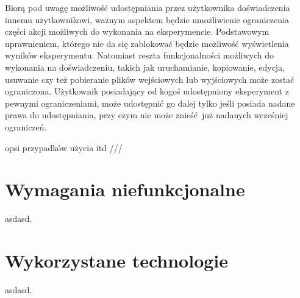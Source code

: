 Biorą pod uwagę możliwość udostępniania przez użytkownika doświadczenia innemu użytkownikowi, ważnym aspektem będzie umożliwienie ograniczenia części akcji możliwych do wykonania na eksperymencie. Podstawowym uprawnieniem, którego nie da się zablokować będzie możliwość wyświetlenia wyników eksperymentu. Natomiast reszta funkcjonalności możliwych do wykonania na doświadczeniu, takich jak uruchamianie, kopiowanie, edycja, usuwanie czy też pobieranie plików wejściowych lub wyjściowych może zostać ograniczona. Użytkownik posiadający od kogoś udostępniony eksperyment z pewnymi ograniczeniami, może udostępnić go dalej tylko jeśli posiada nadane prawa do udostępniania, przy czym nie może znieść już nadanych wcześniej ograniczeń.

opsi przypadków użycia itd ///  
\section{Wymagania niefunkcjonalne}
asdasd.
\section{Wykorzystane technologie}
asdasd.